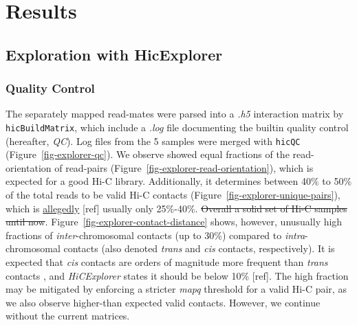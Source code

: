 \documentclass[
  11pt,
  a4paper,
]{scrbook}
\let\oldemph\emph
\renewcommand\emph[1]{\oldemph{\color{gray}#1}}
\begin{document}
\newpage{}

\chapter{Results}\label{results}

\section{Exploration with
HicExplorer}\label{exploration-with-hicexplorer}

\subsection{Quality Control}\label{quality-control}

The separately mapped read-mates were parsed into a \emph{.h5}
interaction matrix by \texttt{hicBuildMatrix}, which include a
\emph{.log} file documenting the builtin quality control (hereafter,
\emph{QC}). Log files from the 5 samples were merged with \texttt{hicQC}
(Figure~\ref{fig-explorer-qc}). We observe showed equal fractions of the
read-orientation of read-pairs
(Figure~\ref{fig-explorer-read-orientation}), which is expected for a
good Hi-C library. Additionally, it determines between 40\% to 50\% of
the total reads to be valid Hi-C contacts
(Figure~\ref{fig-explorer-unique-pairs}), which is
\href{https://hicexplorer.readthedocs.io/en/latest/content/example_usage.html\#creation-of-a-hi-c-matrix}{allegedly}
{[}ref{]} usually only 25\%-40\%. \st{Overall a solid set of Hi-C
samples until now}. Figure~\ref{fig-explorer-contact-distance} shows,
however, unusually high fractions of \emph{inter}-chromosomal contacts
(up to 30\%) compared to \emph{intra}-chromosomal contacts (also denoted
\emph{trans} and \emph{cis} contacts, respectively). It is expected that
\emph{cis} contacts are orders of magnitude more frequent than
\emph{trans} contacts
\citetext{\citealp[p.~236]{bicciato_hic_2022}; \citealp{lieberman_aiden_comprehensive_2009}},
and \emph{HiCExplorer} states it should be below 10\% {[}ref{]}. The
high fraction may be mitigated by enforcing a stricter \emph{mapq}
threshold for a valid Hi-C pair, as we also observe higher-than expected
valid contacts. However, we continue without the current matrices.
\end{document}
